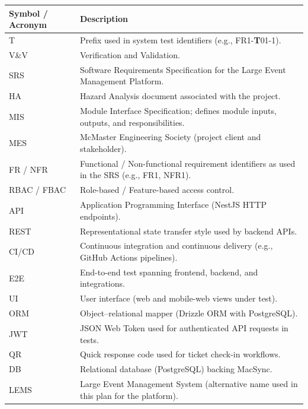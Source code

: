 \documentclass[12pt, titlepage]{article}
\begin{document}
\renewcommand{\arraystretch}{1.2}
\begin{tabularx}{\textwidth}{l X} 
  \toprule		
  \textbf{Symbol / Acronym} & \textbf{Description}\\
  \midrule 
  T & Prefix used in system test identifiers (e.g., FR1-\textbf{T}01-1).\\
  V\&V & Verification and Validation.\\
  SRS & Software Requirements Specification for the Large Event Management Platform.\\
  HA & Hazard Analysis document associated with the project.\\
  MIS & Module Interface Specification; defines module inputs, outputs, and responsibilities.\\
  MES & McMaster Engineering Society (project client and stakeholder).\\
  FR / NFR & Functional / Non-functional requirement identifiers as used in the SRS (e.g., FR1, NFR1).\\
  RBAC / FBAC & Role-based / Feature-based access control.\\
  API & Application Programming Interface (NestJS HTTP endpoints).\\
  REST & Representational state transfer style used by backend APIs.\\
  CI/CD & Continuous integration and continuous delivery (e.g., GitHub Actions pipelines).\\
  E2E & End-to-end test spanning frontend, backend, and integrations.\\
  UI & User interface (web and mobile-web views under test).\\
  ORM & Object--relational mapper (Drizzle ORM with PostgreSQL).\\
  JWT & JSON Web Token used for authenticated API requests in tests.\\
  QR & Quick response code used for ticket check-in workflows.\\
  DB & Relational database (PostgreSQL) backing MacSync.\\
  LEMS & Large Event Management System (alternative name used in this plan for the platform).\\
  \bottomrule
\end{tabularx}\\
\end{document}
